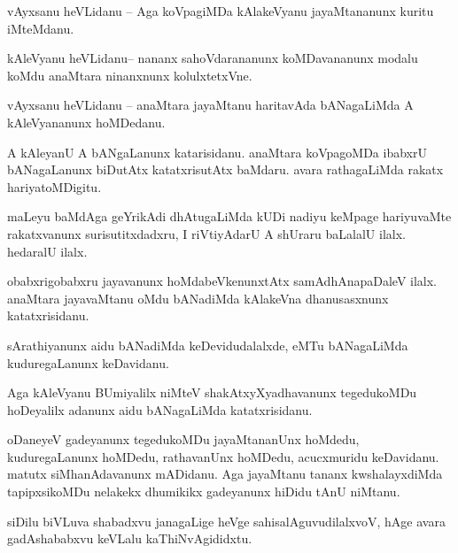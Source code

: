 \documentclass{article}
\begin{document}
\begin{mng}%
vAyxsanu heVLidanu -- Aga koVpagiMDa kAlakeVyanu jayaMtananunx kuritu iMteMdanu.
\end{mng}

\begin{mng}%
kAleVyanu heVLidanu-- nananx sahoVdarananunx koMDavananunx modalu koMdu anaMtara ninanxnunx 
kolulxtetxVne.
\end{mng}

\begin{mng}%
vAyxsanu heVLidanu -- anaMtara jayaMtanu haritavAda bANagaLiMda A kAleVyananunx hoMDedanu.
\end{mng}

\begin{mng}%
A kAleyanU A bANgaLanunx katarisidanu. anaMtara koVpagoMDa ibabxrU bANagaLanunx biDutAtx 
katatxrisutAtx baMdaru. avara rathagaLiMda rakatx hariyatoMDigitu.
\end{mng}

\begin{mng}%
maLeyu baMdAga geYrikAdi dhAtugaLiMda kUDi nadiyu keMpage hariyuvaMte rakatxvanunx 
surisutitxdadxru, I riVtiyAdarU A shUraru baLalalU ilalx. hedaralU ilalx.
\end{mng}

\begin{mng}%
obabxrigobabxru jayavanunx hoMdabeVkenunxtAtx samAdhAnapaDaleV ilalx. anaMtara jayavaMtanu oMdu 
bANadiMda kAlakeVna dhanusasxnunx katatxrisidanu.
\end{mng}

\begin{mng}%
sArathiyanunx aidu bANadiMda keDevidudalalxde, eMTu bANagaLiMda kuduregaLanunx keDavidanu.
\end{mng}

\begin{mng}%
Aga kAleVyanu BUmiyalilx niMteV shakAtxyXyadhavanunx tegedukoMDu hoDeyalilx adanunx aidu 
bANagaLiMda katatxrisidanu.
\end{mng}

\begin{mng}%
oDaneyeV gadeyanunx tegedukoMDu jayaMtananUnx hoMdedu, kuduregaLanunx hoMDedu, rathavanUnx hoMDedu, 
acucxmuridu keDavidanu. matutx siMhanAdavanunx mADidanu. Aga jayaMtanu tananx kwshalayxdiMda 
tapipxsikoMDu nelakekx dhumikikx gadeyanunx hiDidu tAnU niMtanu.
\end{mng}

\begin{mng}%
siDilu biVLuva shabadxvu janagaLige heVge sahisalAguvudilalxvoV, hAge avara gadAshababxvu keVLalu 
kaThiNvAgididxtu.
\end{mng}
\end{document}
